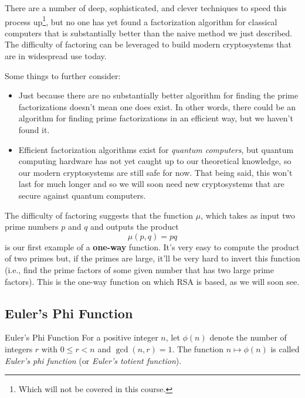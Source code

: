 \documentclass[letterpaper]{article}
\begin{document}
\bigskip 

There are a number of deep, sophisticated, and clever techniques to speed this process up\footnote{Which will not be covered in this course.}, but no one has yet found a factorization algorithm for classical computers that is substantially better than the naive method we just described. The difficulty of factoring can be leveraged to build modern cryptosystems that are in widespread use today. 

\bigskip 

Some things to further consider: 
\begin{itemize}
    \item Just because there are no substantially better algorithm for finding the prime factorizations doesn't mean one does exist. In other words, there could be an algorithm for finding prime factorizations in an efficient way, but we haven't found it. 
    \item Efficient factorization algorithms exist for \emph{quantum computers}, but quantum computing hardware has not yet caught up to our theoretical knowledge, so our modern cryptosystems are still safe for now. That being said, this won't last for much longer and so we will soon need new cryptosystems that are secure against quantum computers.
\end{itemize}

\bigskip 

The difficulty of factoring suggests that the function $\mu$, which takes as input two prime numbers $p$ and $q$ and outputs the product \[\mu(p, q) = pq\] is our first example of a \textbf{one-way} function. It's very easy to compute the product of two primes but, if the primes are large, it'll be very hard to invert this function (i.e., find the prime factors of some given number that has two large prime factors). This is the one-way function on which RSA is based, as we will soon see. 


\subsection{Euler's Phi Function}
\begin{definition}{Euler's Phi Function}{}
    For a positive integer $n$, let $\phi(n)$ denote the number of integers $r$ with $0 \leq r < n$ and $\gcd(n, r) = 1$. The function $n \mapsto \phi(n)$ is called \emph{Euler's phi function} (or \emph{Euler's totient function}).
\end{definition}
\end{document}
